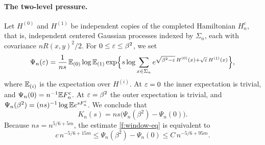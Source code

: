\paragraph{The two-level pressure.} Let $H^{(0)}$ and $H^{(1)}$ be independent copies of the completed Hamiltonian $H_n^c$, that is, independent centered Gaussian processes indexed by $\Sigma_n$, each with covariance $nR(x,y)^2/2$. For $0\le\varepsilon\le\beta^2$, we set
\begin{equation}\label{eq:fl-two-level}
 \Psi_n(\varepsilon)=\frac{1}{ns}\,\mathbb E_{(0)}\log\mathbb E_{(1)}\exp\Bigl\{s\log\sum_{x\in\Sigma_n}
 e^{\sqrt{\beta^2-\varepsilon}\,H^{(0)}(x)+\sqrt{\varepsilon}\,H^{(1)}(x)}\Bigr\},
\end{equation}
where $\mathbb E_{(i)}$ is the expectation over $H^{(i)}$. At $\varepsilon=0$ the inner expectation is trivial, and $\Psi_n(0)=n^{-1}\mathbb E F_n^c$. At $\varepsilon=\beta^2$ the outer expectation is trivial, and $\Psi_n(\beta^2)=(ns)^{-1}\log\mathbb E e^{sF_n^c}$. We conclude that
\begin{equation}\label{eq:fl-two-level-endpoints}
 K_n(s)=ns\bigl(\Psi_n(\beta^2)-\Psi_n(0)\bigr).
\end{equation}
Because $ns=n^{5/6+5m}$, the estimate \eqref{f:window-eq} is equivalent to
\begin{equation}\label{eq:fl-pressure-window}
 c\,n^{-5/6+15m}\le\Psi_n(\beta^2)-\Psi_n(0)\le C\,n^{-5/6+95m}.
\end{equation}

